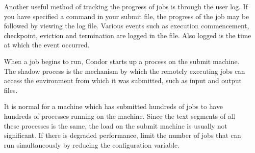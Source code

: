 Another useful method of tracking the progress of jobs is through the
user log.  If you have specified a  command in 
your submit file, the progress of the job may be followed by viewing the
log file.  Various events such as execution commencement, checkpoint, eviction 
and termination are logged in the file.
Also logged is the time at which the event occurred.

When a job begins to run, Condor starts up a  process
on the submit machine.  The shadow process is the mechanism by which the
remotely executing jobs can access the environment from which it was
submitted, such as input and output files.  

It is normal for a machine which has submitted hundreds of jobs to have 
hundreds of  processes running on the machine.
Since the text segments of all these processes is the same,
the load on the submit machine is usually not significant.
If there is degraded performance, limit 
the number of jobs that can run simultaneously by reducing the 
 configuration variable.

